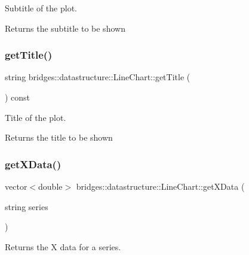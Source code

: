 Subtitle of the plot. 

\begin{DoxyReturn}{Returns}
the subtitle to be shown 
\end{DoxyReturn}
\mbox{\label{classbridges_1_1datastructure_1_1_line_chart_aa38d6cf9657d2757a98b657f079ae2bc}} 
\subsubsection{\texorpdfstring{get\+Title()}{getTitle()}}
{\footnotesize\ttfamily string bridges\+::datastructure\+::\+Line\+Chart\+::get\+Title (\begin{DoxyParamCaption}{ }\end{DoxyParamCaption}) const\hspace{0.3cm}{\ttfamily [inline]}}



Title of the plot. 

\begin{DoxyReturn}{Returns}
the title to be shown 
\end{DoxyReturn}
\mbox{\label{classbridges_1_1datastructure_1_1_line_chart_af624657af0ddd7d58c1d9290b4874280}} 
\subsubsection{\texorpdfstring{get\+X\+Data()}{getXData()}}
{\footnotesize\ttfamily vector$<$double$>$ bridges\+::datastructure\+::\+Line\+Chart\+::get\+X\+Data (\begin{DoxyParamCaption}\item[{string}]{series }\end{DoxyParamCaption})\hspace{0.3cm}{\ttfamily [inline]}}



Returns the X data for a series. 


